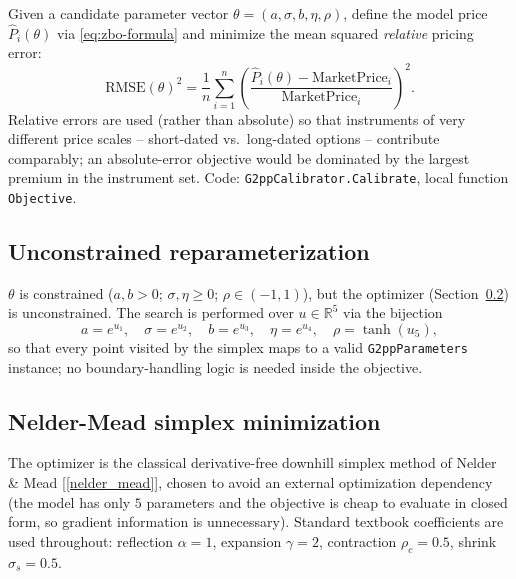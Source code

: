 \documentclass[11pt,a4paper]{article}
\newcommand{\R}{\mathbb{R}}
\newcommand{\coderef}[1]{\texttt{\color{blue!60!black}#1}}
\theoremstyle{definition}
\begin{document}
Given a candidate parameter vector $\theta=(a,\sigma,b,\eta,\rho)$, define
the model price $\hat{P}_i(\theta)$ via \eqref{eq:zbo-formula} and minimize
the mean squared \emph{relative} pricing error:
\begin{equation}
  \text{RMSE}(\theta)^2 = \frac{1}{n}\sum_{i=1}^n
    \left(\frac{\hat{P}_i(\theta)-\text{MarketPrice}_i}{\text{MarketPrice}_i}\right)^2.
  \label{eq:calib-objective}
\end{equation}
Relative errors are used (rather than absolute) so that instruments of very
different price scales -- short-dated vs.\ long-dated options -- contribute
comparably; an absolute-error objective would be dominated by the largest
premium in the instrument set. Code: \coderef{G2ppCalibrator.Calibrate},
local function \texttt{Objective}.

\subsection{Unconstrained reparameterization}

$\theta$ is constrained ($a,b>0$; $\sigma,\eta\ge0$; $\rho\in(-1,1)$), but
the optimizer (Section~\ref{sec:nelder-mead}) is unconstrained. The search is
performed over $u\in\R^5$ via the bijection
\begin{equation}
  a=e^{u_1},\quad \sigma=e^{u_2},\quad b=e^{u_3},\quad \eta=e^{u_4},\quad
  \rho=\tanh(u_5),
  \label{eq:reparam}
\end{equation}
so that every point visited by the simplex maps to a valid
\coderef{G2ppParameters} instance; no boundary-handling logic is needed
inside the objective.

\subsection{Nelder-Mead simplex minimization}
\label{sec:nelder-mead}

The optimizer is the classical derivative-free downhill simplex method of
Nelder \& Mead [\ref{nelder_mead}], chosen to avoid an external optimization
dependency (the model has only $5$ parameters and the objective is cheap
to evaluate in closed form, so gradient information is unnecessary).
Standard textbook coefficients are used throughout: reflection $\alpha=1$,
expansion $\gamma=2$, contraction $\rho_c=0.5$, shrink $\sigma_s=0.5$.
\end{document}

